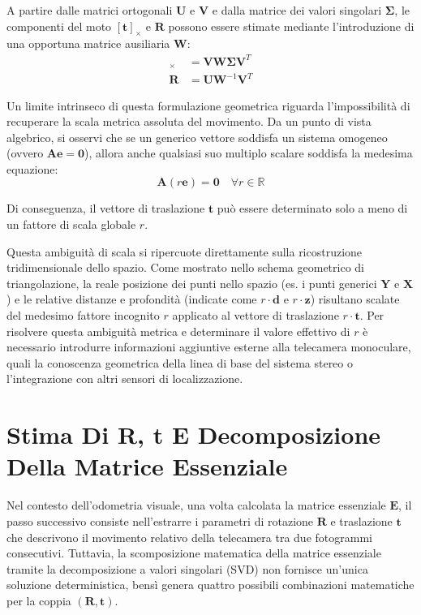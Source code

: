 ﻿\documentclass[11pt, a4paper]{article}
\begin{document}
A partire dalle matrici ortogonali $\bm{U}$ e $\bm{V}$ e dalla matrice dei valori singolari $\bm{\Sigma}$, le componenti del moto $[\bm{t}]_{\times}$ e $\bm{R}$ possono essere stimate mediante l'introduzione di una opportuna matrice ausiliaria $\bm{W}$:
\begin{align*}
[\bm{t}]_{\times} &= \bm{V}\bm{W}\bm{\Sigma}\bm{V}^T \\
\bm{R} &= \bm{U}\bm{W}^{-1}\bm{V}^T
\end{align*}

Un limite intrinseco di questa formulazione geometrica riguarda l'impossibilità di recuperare la scala metrica assoluta del movimento. Da un punto di vista algebrico, si osservi che se un generico vettore soddisfa un sistema omogeneo (ovvero $\bm{A}\bm{e} = \bm{0}$), allora anche qualsiasi suo multiplo scalare soddisfa la medesima equazione:
\[ \bm{A}(r\bm{e}) = \bm{0} \quad \forall r \in \mathbb{R} \]

Di conseguenza, il vettore di traslazione $\bm{t}$ può essere determinato solo a meno di un fattore di scala globale $r$.


Questa ambiguità di scala si ripercuote direttamente sulla ricostruzione tridimensionale dello spazio. Come mostrato nello schema geometrico di triangolazione, la reale posizione dei punti nello spazio (es. i punti generici $\bm{Y}$ e $\bm{X}$) e le relative distanze e profondità (indicate come $r\cdot\bm{d}$ e $r\cdot\bm{z}$) risultano scalate del medesimo fattore incognito $r$ applicato al vettore di traslazione $r\cdot\bm{t}$.
Per risolvere questa ambiguità metrica e determinare il valore effettivo di $r$ è necessario introdurre informazioni aggiuntive esterne alla telecamera monoculare, quali la conoscenza geometrica della linea di base del sistema stereo o l'integrazione con altri sensori di localizzazione.

\section{Stima Di R, t E Decomposizione Della Matrice Essenziale}

Nel contesto dell'odometria visuale, una volta calcolata la matrice essenziale $\bm{E}$, il passo successivo consiste nell'estrarre i parametri di rotazione $\bm{R}$ e traslazione $\bm{t}$ che descrivono il movimento relativo della telecamera tra due fotogrammi consecutivi. Tuttavia, la scomposizione matematica della matrice essenziale tramite la decomposizione a valori singolari (SVD) non fornisce un'unica soluzione deterministica, bensì genera quattro possibili combinazioni matematiche per la coppia $(\bm{R}, \bm{t})$.
\end{document}
